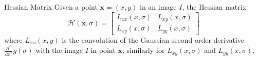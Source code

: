 \documentclass[xcolor=dvipsnames]{beamer}
\begin{document}
\begin{frame}[label=math-hessian]{Hessian Matrix}
Given a point $\mathbf{x} = (x,y)$ in an image $I$, the Hessian matrix 
\begin{equation}
\mathcal{H}(\mathbf{x}, \sigma) =
 \begin{bmatrix}
  L_{xx}(x,\sigma) &
  L_{xy}(x,\sigma) \\
  L_{xy}(x,\sigma) &
  L_{yy}(x,\sigma) 
 \end{bmatrix}
\end{equation}
where $L_{xx}(x,y)$ is the convolution of the Gaussian second-order derivative 
$\frac{\partial^2}{\partial x^x}g(\sigma)$ with the image $I$ in point $\mathbf{x}$; similarly for 
  $L_{xy}(x,\sigma)$ and
  $L_{yy}(x,\sigma)$.
\end{frame}
\end{document}
